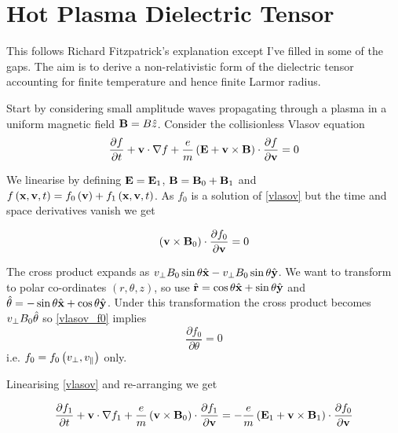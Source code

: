 \section{Hot Plasma Dielectric Tensor}
This follows Richard Fitzpatrick's explanation \cite{fitzpatrick2014plasma} except I've filled in some of the gaps. The aim is to derive a non-relativistic form of the dielectric tensor accounting for finite temperature and hence finite Larmor radius.

Start by considering small amplitude waves propagating through a plasma in a uniform magnetic field $\textbf{B} = B\hat{z}$. Consider the collisionless Vlasov equation
\begin{equation}\label{vlasov}
	\frac{\partial f}{\partial t} + \textbf{v} \cdot \nabla f + \frac{e}{m} \left( \textbf{E} + \textbf{v} \times \textbf{B} \right) \cdot \frac{\partial f}{\partial \textbf{v}} = 0
\end{equation}

We linearise by defining $\textbf{E} = \textbf{E}_1$, $\textbf{B} = \textbf{B}_0 + \textbf{B}_1$ and $f\left(\textbf{x}, \textbf{v}, t\right) = f_0 \left(\textbf{v}\right) + f_1 \left(\textbf{x}, \textbf{v}, t\right)$. As $f_0$ is a solution of \eqref{vlasov} but the time and space derivatives vanish we get

\begin{equation}\label{vlasov_f0}
	\left(\textbf{v} \times \textbf{B}_0\right) \cdot \frac{\partial f_0}{\partial \textbf{v}} = 0
\end{equation}

The cross product expands as $v_\perp B_0 \sin \theta \hat{\textbf{x}} - v_\perp B_0 \sin \theta \hat{\textbf{y}}$. We want to transform to polar co-ordinates $\left(r, \theta, z\right)$, so use $\hat{\textbf{r}}=\cos\theta\hat{\textbf{x}} + \sin\theta\hat{\textbf{y}}$ and $\hat{\theta}=-\sin\theta\hat{\textbf{x}} + \cos\theta\hat{\textbf{y}}$. Under this transformation the cross product becomes $v_\perp B_0 \hat{\theta}$ so \eqref{vlasov_f0} implies
\begin{equation}
	\frac{\partial f_0}{\partial \theta} = 0
\end{equation}
i.e. $f_0 = f_0 \left(v_\perp, v_\parallel \right)$ only.

Linearising \eqref{vlasov} and re-arranging we get

\begin{equation}\label{vlasov_linearised}
	\frac{\partial f_1}{\partial t} + \textbf{v} \cdot \nabla f_1 + \frac{e}{m} \left(\textbf{v} \times \textbf{B}_0\right) \cdot \frac{\partial f_1}{\partial \textbf{v}} = -\frac{e}{m} \left(\textbf{E}_1 + \textbf{v} \times \textbf{B}_1\right) \cdot \frac{\partial f_0}{\partial \textbf{v}}
\end{equation}

